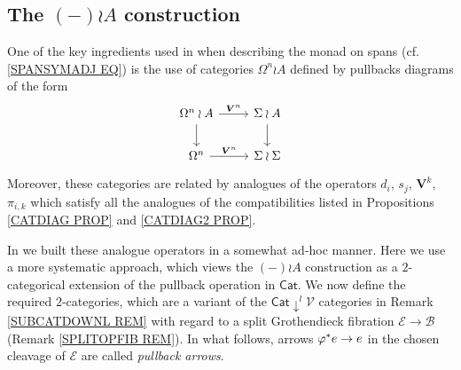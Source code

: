 \documentclass[a4paper,10pt
]{article}%
\numberwithin{equation}{section}
\numberwithin{figure}{section}
\theoremstyle{definition} %
\newcommand{\Cat}{\mathsf{Cat}}
\newcommand{\V}{\ensuremath{\mathcal V}}
\newcommand{\1}{\ensuremath{\mathbbm 1}}%
\begin{document}
\subsection{The $(-)\wr A$ construction}\label{WRACONST SEC}


One of the key ingredients used in \cite[\S 4.2]{BP21} when describing the monad on spans (cf. \eqref{SPANSYMADJ EQ})
is the use of categories 
$\Omega^n \wr A$ defined by pullbacks diagrams of the form
\begin{equation}\label{WRASAMPLE EQ}
\begin{tikzcd}
\Omega^n \wr A \ar{r}{\boldsymbol{V}^n} \ar{d} &
\Sigma \wr A  \ar{d}
\\
\Omega^n \ar{r}{\boldsymbol{V}^n} &
\Sigma \wr \Sigma
\end{tikzcd}
\end{equation}
Moreover, these categories are related by analogues of the operators $d_i$, $s_j$, $\boldsymbol{V}^k$, $\pi_{i,k}$
which satisfy all the analogues of the compatibilities 
listed in Propositions \ref{CATDIAG PROP} and \ref{CATDIAG2 PROP}.

In \cite{BP21} we built these analogue operators in a somewhat ad-hoc manner. Here we use a more systematic approach,
which views the $(-) \wr A$ construction as a $2$-categorical extension of the pullback operation in $\Cat$.
We now define the required $2$-categories,
which are a variant of the 
$\mathsf{Cat}\downarrow^l \V$
categories in Remark \ref{SUBCATDOWNL REM} with regard to 
a split Grothendieck fibration $\mathcal{E} \to \mathcal{B}$
(Remark \ref{SPLITOPFIB REM}).
In what follows, arrows 
$\varphi^{\**}e \to e$ in
the chosen cleavage of $\mathcal{E}$ are called \emph{pullback arrows}.
\end{document}
